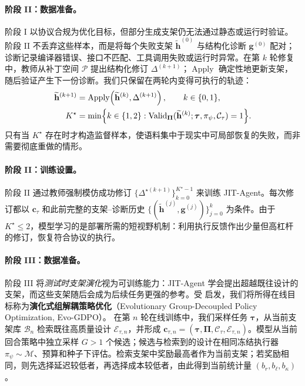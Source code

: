 \documentclass{article}
\newcommand{\ourmethod}{JIT-Agent\xspace}
\begin{document}
\paragraph{阶段 II：数据准备。}
阶段 I 以协议合规为优化目标，但部分生成支架仍无法通过静态或运行时验证。阶段 II 不丢弃这些样本，而是将每个失败支架 $\widetilde{\mathbf{h}}^{(0)}$ 与结构化诊断 $\mathbf{g}^{(0)}$ 配对；诊断记录编译器错误、接口不匹配、工具调用失败或运行时异常。在第 $k$ 轮修复中，教师从补丁空间 $\mathcal{P}$ 提出结构化修订 $\Delta^{(k+1)}$；$\operatorname{Apply}$ 确定性地更新支架，随后验证产生下一份诊断。我们只保留在两轮内变得可执行的轨迹：
\begin{equation}
\label{eq:stage2_repair}
\begin{aligned}
\widetilde{\mathbf{h}}^{(k+1)}
&= \operatorname{Apply}\!\left(\widetilde{\mathbf{h}}^{(k)},\Delta^{(k+1)}\right), \qquad k\in\{0,1\},\\
K^{\star}
&= \min\Bigl\{k\in\{1,2\}:\operatorname{Valid}_{\boldsymbol{\Pi}}(\widetilde{\mathbf{h}}^{(k)};\boldsymbol{\tau},\pi_{\psi},\mathcal{C}_{\tau})=1\Bigr\}.
\end{aligned}
\end{equation}
只有当 $K^{\star}$ 存在时才构造监督样本，使语料集中于现实中可局部恢复的失败，而非需要彻底重做的情形。

\vspace{-0.5em}
\paragraph{阶段 II：训练设置。}
阶段 II 通过教师强制模仿成功修订 $\{\Delta^{\star(k+1)}\}_{k=0}^{K^{\star}-1}$ 来训练 \ourmethod。每次修订都以 $\mathbf{c}_{\tau}$ 和此前完整的支架--诊断历史 $\{(\widetilde{\mathbf{h}}^{(j)},\mathbf{g}^{(j)})\}_{j=0}^{k}$ 为条件。由于 $K^{\star}\le 2$，模型学习的是部署所需的短视野机制：利用执行反馈作出少量但高杠杆的修订，恢复符合协议的执行。

\vspace{-0.5em}
\paragraph{阶段 III：数据准备。}\label{sec:harness_evolution}
阶段 III 将\emph{测试时支架演化}视为可训练能力：\ourmethod 学会提出超越既往设计的支架，而这些支架随后会成为后续任务更强的参考。受 \citep{liu2026gdpogrouprewarddecouplednormalization} 启发，我们将所得在线目标称为\textbf{演化式组解耦策略优化}（Evolutionary Group-Decoupled Policy Optimization, Evo-GDPO）。
在第 $n$ 轮在线训练中，我们采样任务 $\boldsymbol{\tau}$，从当前支架库 $\mathcal{B}_n$ 检索既往高质量设计 $\mathcal{E}_{\tau,n}$，并形成 $\mathbf{c}_{\tau,n}=(\boldsymbol{\tau},\boldsymbol{\Pi},\mathcal{C}_{\tau},\mathcal{E}_{\tau,n})$。模型从当前回合策略中独立采样 $G>1$ 个候选；候选与检索到的设计在相同冻结执行器 $\pi_{\psi}\sim\mathcal{M}$、预算和种子下评估。检索支架中奖励最高者作为当前支架；若奖励相同，则先选择延迟较低者，再选择成本较低者，由此得到当前统计量 $(b_r,b_{\ell},b_{\kappa})$。
\end{document}
